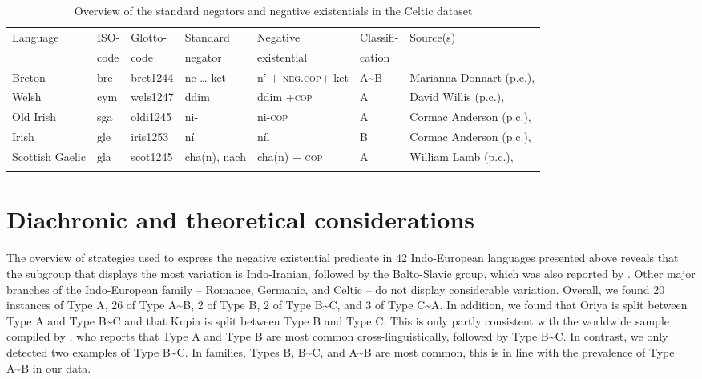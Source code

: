 \documentclass[output=paper,colorlinks,citecolor=brown]{langscibook}
\begin{document}
\begin{table}\begin{small}
\caption{Overview of the standard negators and negative existentials in the
Celtic dataset}\label{tab:ieur-class-Celtic}
\begin{tabularx}{\textwidth}{@{} p{14mm} l l p{14mm} p{16mm} l Q @{}}
\lsptoprule
{Language} & {ISO-} & {Glotto-} & {Standard} &
{Negative} & {Classifi-} & {Source(s)}\\
& {code} & {code} & {negator} & {existential} &
{cation} \\
\midrule
    {Breton} & bre & bret1244 & ne … ket & n’ +\newline
    \textsc{neg.cop}\newline +  ket & A{\textasciitilde}B & Marianna Donnart (p.c.), \citet{Press1986}\\
\tablevspace
    {Welsh} & cym & wels1247 & ddim & ddim +\newline \textsc{cop} & A & David Willis (p.c.), \citet{King2003}\\
\tablevspace
{Old Irish} & sga & oldi1245 & ni- & ni-\textsc{cop} & A & Cormac
Anderson (p.c.), \textcites{Stenson1981}{Stenson2008}\\
\tablevspace
{Irish} & gle & iris1253 & ní & níl & B & Cormac Anderson (p.c.), \citet{McCone2005}\\
\tablevspace
{Scottish Gaelic} & gla & scot1245 & cha(n), nach & cha(n) +\newline
    \textsc{cop} & A & William Lamb (p.c.), \citet{Lamb2001}\\
\lspbottomrule
\end{tabularx}
\end{small}\end{table}

\section{Diachronic and theoretical considerations}\label{sec:ieur-5}

The overview of strategies used to express the negative existential
predicate in 42 Indo-European languages presented above reveals that the
subgroup that displays the most variation is Indo-Iranian, followed by the
Balto-Slavic group, which was also reported by \citet{Veselinova2014}.
Other major branches of the Indo-European family – Romance, Germanic, and
Celtic – do not display considerable variation. Overall, we found 20
instances of Type A, 26 of Type A{\textasciitilde}B, 2 of Type B, 2 of Type
B{\textasciitilde}C, and 3 of Type C{\textasciitilde}A. In addition, we
found that Oriya is split between Type A and Type B{\textasciitilde}C and
that Kupia is split between Type B and Type C. This is only partly
consistent with the worldwide sample compiled by
\citet[147]{Veselinova2016}, who reports that Type A and Type B are most
common cross-linguistically, followed by Type B{\textasciitilde}C. In
contrast, we only detected two examples of Type B{\textasciitilde}C. In
 families, Types B, B{\textasciitilde}C, and A{\textasciitilde}B are most common, this is in line with the prevalence of Type A{\textasciitilde}B in our data.
\end{document}
